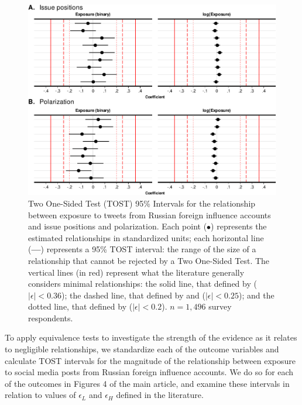 \documentclass[
  12pt,
]{article}
\begin{document}
\begin{figure}
\centering
\includegraphics{Appendix_files/figure-latex/Figure-B3-1.pdf}
\caption{\label{fig:Figure-B3}Two One-Sided Test (TOST) 95\% Intervals for the relationship between exposure to tweets from Russian foreign influence accounts and issue positions and polarization. Each point (\(\bullet\)) represents the estimated relationships in standardized units; each horizontal line (\textbf{---}) represents a 95\% TOST interval: the range of the size of a relationship that cannot be rejected by a Two One-Sided Test. The vertical lines (in red) represent what the literature generally considers minimal relationships: the solid line, that defined by \citet{Hartman2018} (\(|\epsilon| < 0.36\)); the dashed line, that defined by \citet{Ho2007} and \citet{Imbens2015} (\(|\epsilon| < 0.25\)); and the dotted line, that defined by \citet{Cohen1969} (\(|\epsilon| < 0.2\)). \(n = 1,496\) survey respondents.}
\end{figure}

To apply equivalence tests to investigate the strength of the evidence as it relates to negligible relationships, we standardize each of the outcome variables and calculate TOST intervals for the magnitude of the relationship between exposure to social media posts from Russian foreign influence accounts. We do so for each of the outcomes in Figures 4 of the main article, and examine these intervals in relation to values of \(\epsilon_L\) and \(\epsilon_H\) defined in the literature.
\end{document}

